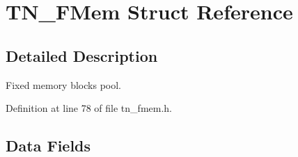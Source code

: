 \hypertarget{structTN__FMem}{\section{T\+N\+\_\+\+F\+Mem Struct Reference}
\label{structTN__FMem}
}


\subsection{Detailed Description}
Fixed memory blocks pool. 

Definition at line 78 of file tn\+\_\+fmem.\+h.

\subsection*{Data Fields}
